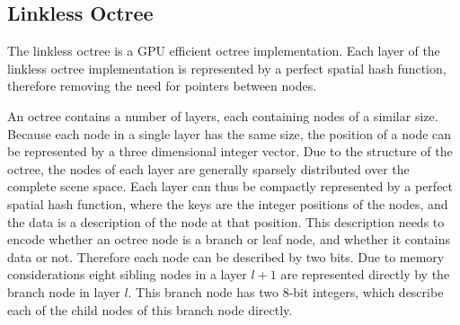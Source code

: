 




\subsection{Linkless Octree}

The linkless octree\cite{choi2009linkless} is a GPU efficient octree implementation. Each layer
of the linkless octree implementation is represented by a perfect spatial hash function,
therefore removing the need for pointers between nodes.

An octree contains a number of layers, each containing nodes of a similar size. Because each node
in a single layer has the same size, the position of a node can be represented by a three
dimensional integer vector. Due to the structure of the octree, the nodes of each layer
are generally sparsely distributed over the complete scene space. Each layer can thus be
compactly represented by a perfect spatial hash function, where the keys are the integer
positions of the nodes, and the data is a description of the node at that position.
This description needs to encode whether an octree node is a branch or leaf node, and
whether it contains data or not. Therefore each node can be described by two bits.
Due to memory considerations eight sibling nodes in a layer $l + 1$ are represented
directly by the branch node in layer $l$. This branch node has two 8-bit integers, which
describe each of the child nodes of this branch node directly.

